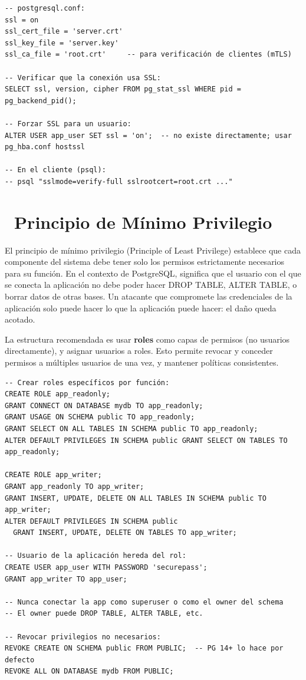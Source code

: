 \begin{lstlisting}[caption={SSL/TLS — requerir cifrado en tránsito}]
-- postgresql.conf:
ssl = on
ssl_cert_file = 'server.crt'
ssl_key_file = 'server.key'
ssl_ca_file = 'root.crt'     -- para verificación de clientes (mTLS)

-- Verificar que la conexión usa SSL:
SELECT ssl, version, cipher FROM pg_stat_ssl WHERE pid = pg_backend_pid();

-- Forzar SSL para un usuario:
ALTER USER app_user SET ssl = 'on';  -- no existe directamente; usar pg_hba.conf hostssl

-- En el cliente (psql):
-- psql "sslmode=verify-full sslrootcert=root.crt ..."
\end{lstlisting}

\section[Principio de Mínimo Privilegio]{~Principio de Mínimo Privilegio}

El principio de mínimo privilegio (Principle of Least Privilege) establece que cada componente del sistema debe tener solo los permisos estrictamente necesarios para su función.
En el contexto de PostgreSQL, significa que el usuario con el que se conecta la aplicación no debe poder hacer DROP TABLE, ALTER TABLE, o borrar datos de otras bases.
Un atacante que compromete las credenciales de la aplicación solo puede hacer lo que la aplicación puede hacer: el daño queda acotado.

La estructura recomendada es usar \textbf{roles} como capas de permisos (no usuarios directamente), y asignar usuarios a roles.
Esto permite revocar y conceder permisos a múltiples usuarios de una vez, y mantener políticas consistentes.

\begin{lstlisting}[caption={Roles y privilegios granulares}]
-- Crear roles específicos por función:
CREATE ROLE app_readonly;
GRANT CONNECT ON DATABASE mydb TO app_readonly;
GRANT USAGE ON SCHEMA public TO app_readonly;
GRANT SELECT ON ALL TABLES IN SCHEMA public TO app_readonly;
ALTER DEFAULT PRIVILEGES IN SCHEMA public GRANT SELECT ON TABLES TO app_readonly;

CREATE ROLE app_writer;
GRANT app_readonly TO app_writer;
GRANT INSERT, UPDATE, DELETE ON ALL TABLES IN SCHEMA public TO app_writer;
ALTER DEFAULT PRIVILEGES IN SCHEMA public
  GRANT INSERT, UPDATE, DELETE ON TABLES TO app_writer;

-- Usuario de la aplicación hereda del rol:
CREATE USER app_user WITH PASSWORD 'securepass';
GRANT app_writer TO app_user;

-- Nunca conectar la app como superuser o como el owner del schema
-- El owner puede DROP TABLE, ALTER TABLE, etc.

-- Revocar privilegios no necesarios:
REVOKE CREATE ON SCHEMA public FROM PUBLIC;  -- PG 14+ lo hace por defecto
REVOKE ALL ON DATABASE mydb FROM PUBLIC;
\end{lstlisting}


